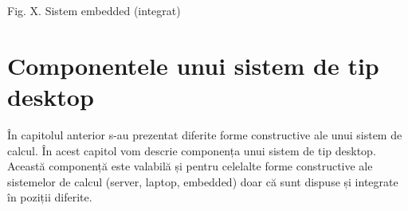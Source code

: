 Fig. X. Sistem embedded (integrat)

\section{Componentele unui sistem de tip desktop}
\label{sec:hardware-componente}

În capitolul anterior s-au prezentat diferite forme constructive ale unui sistem
de calcul. În acest capitol vom descrie componența unui sistem de tip desktop.
Această componență este valabilă și pentru celelalte forme constructive ale
sistemelor de calcul (server, laptop, embedded) doar că sunt dispuse și
integrate în poziții diferite.


